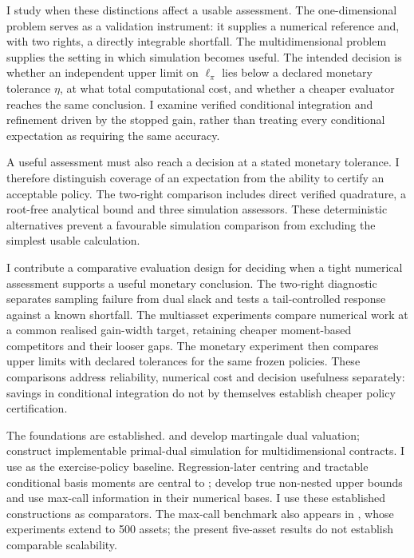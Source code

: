 \documentclass[11pt]{article}
\begin{document}
I study when these distinctions affect a usable assessment. The one-dimensional problem serves as a validation instrument: it supplies a numerical reference and, with two rights, a directly integrable shortfall. The multidimensional problem supplies the setting in which simulation becomes useful. The intended decision is whether an independent upper limit on $\ell_\pi$ lies below a declared monetary tolerance $\eta$, at what total computational cost, and whether a cheaper evaluator reaches the same conclusion. I examine verified conditional integration and refinement driven by the stopped gain, rather than treating every conditional expectation as requiring the same accuracy.

A useful assessment must also reach a decision at a stated monetary tolerance. I therefore distinguish coverage of an expectation from the ability to certify an acceptable policy. The two-right comparison includes direct verified quadrature, a root-free analytical bound and three simulation assessors. These deterministic alternatives prevent a favourable simulation comparison from excluding the simplest usable calculation.

I contribute a comparative evaluation design for deciding when a tight numerical assessment supports a useful monetary conclusion. The two-right diagnostic separates sampling failure from dual slack and tests a tail-controlled response against a known shortfall. The multiasset experiments compare numerical work at a common realised gain-width target, retaining cheaper moment-based competitors and their looser gaps. The monetary experiment then compares upper limits with declared tolerances for the same frozen policies. These comparisons address reliability, numerical cost and decision usefulness separately: savings in conditional integration do not by themselves establish cheaper policy certification.

The foundations are established. \citet{rogers2002} and \citet{haugh2004} develop martingale dual valuation; \citet{andersen2004} construct implementable primal-dual simulation for multidimensional contracts. I use \citet{longstaff2001} as the exercise-policy baseline. Regression-later centring and tractable conditional basis moments are central to \citet{glasserman2004later}; \citet{belomestny2009} develop true non-nested upper bounds and use max-call information in their numerical bases. I use these established constructions as comparators. The max-call benchmark also appears in \citet{becker2019}, whose experiments extend to 500 assets; the present five-asset results do not establish comparable scalability.
\end{document}
